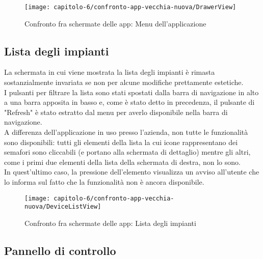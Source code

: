 \begin{figure}[!h]
  \centering 
  \texttt{[image: capitolo-6/confronto-app-vecchia-nuova/DrawerView]} 
  \caption{Confronto fra schermate delle app: Menu dell'applicazione}
\end{figure}

\clearpage %

\subsection{Lista degli impianti}
\label{subsec:lista-impianti}

La schermata in cui viene mostrata la lista degli impianti è rimasta sostanzialmente invariata se non per alcune modifiche prettamente estetiche.\\
I pulsanti per filtrare la lista sono stati spostati dalla barra di navigazione in alto a una barra apposita in basso e, come è stato detto in precedenza, il pulsante di "Refresh" è stato estratto dal menu per averlo disponibile nella barra di navigazione.\\
A differenza dell'applicazione in uso presso l'azienda, non tutte le funzionalità sono disponibili: tutti gli elementi della lista la cui icone rappresentano dei semafori sono cliccabili (e portano alla schermata di dettaglio) mentre gli altri, come i primi due elementi della lista della schermata di destra, non lo sono.\\
In quest'ultimo caso, la pressione dell'elemento visualizza un avviso all'utente che lo informa sul fatto che la funzionalità non è ancora disponibile.

\begin{figure}[!h]
  \centering 
  \texttt{[image: capitolo-6/confronto-app-vecchia-nuova/DeviceListView]} 
  \caption{Confronto fra schermate delle app: Lista degli impianti}
\end{figure}

\clearpage %

\subsection{Pannello di controllo}
\label{subsec:pannello-controllo}

